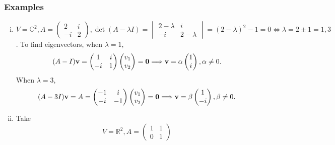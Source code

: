 \documentclass[10pt]{article}
\def\i{{\mathrm i}}
\begin{document}
    \subsubsection{Examples}
    \begin{example}\label{eg:25.1.2}
        \begin{enumerate}[(i)]
            \item $V=\mathbb{C}^{2}, A=\begin{pmatrix}
                2&i\\-i&2
            \end{pmatrix}, \det (A-\lambda I)=\begin{vmatrix}
                2-\lambda & i\\-i & 2-\lambda
            \end{vmatrix}=(2-\lambda)^2-1=0 \Leftrightarrow \lambda=2\pm 1=1,3 $. To find eigenvectors, when $ \lambda=1 $,
            \[
                (A-I){\bf v}=\begin{pmatrix}
                    1&i\\-i&1
                \end{pmatrix}
                \begin{pmatrix}
                    v_1\\v_2
                \end{pmatrix}=\mathbf{0} \Longrightarrow {\bf v}=\alpha\begin{pmatrix}
                    1\\i
                \end{pmatrix},\alpha\neq 0
            .\]
            When $ \lambda=3 $,
            \[
                (A-3I){\bf v}=A=\begin{pmatrix}
                    -1&i\\-i&-1
                \end{pmatrix}\begin{pmatrix}
                    v_1\\v_2
                \end{pmatrix}=\mathbf{0} \Longrightarrow 
                {\bf v}=\beta\begin{pmatrix}
                    1\\-i
                \end{pmatrix},\beta\neq 0
            .\]
            \item Take 
            \[
                V=\mathbb{R}^{2},A=\begin{pmatrix}
                    1&1\\0&1

\end{pmatrix}\]
\end{enumerate}
\end{example}
\end{document}
